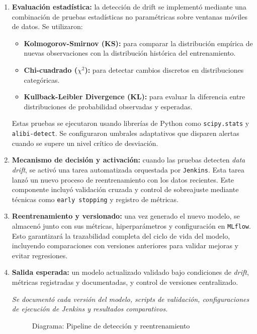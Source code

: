 \begin{enumerate}
    \item \textbf{Evaluación estadística:} la detección de drift se implementó mediante una combinación de pruebas estadísticas no paramétricas sobre ventanas móviles de datos. Se utilizaron:
    \begin{itemize}
      \item \textbf{Kolmogorov-Smirnov (KS):} para comparar la distribución empírica de nuevas observaciones con la distribución histórica del entrenamiento.
      \item \textbf{Chi-cuadrado (\(\chi^2\)):} para detectar cambios discretos en distribuciones categóricas.
      \item \textbf{Kullback-Leibler Divergence (KL):} para evaluar la diferencia entre distribuciones de probabilidad observadas y esperadas.
    \end{itemize}
    Estas pruebas se ejecutaron usando librerías de Python como \texttt{scipy.stats} y \texttt{alibi-detect}. Se configuraron umbrales adaptativos que disparen alertas cuando se supere un nivel crítico de desviación.
    
    \item \textbf{Mecanismo de decisión y activación:} cuando las pruebas detecten \textit{data drift}, se activó una tarea automatizada orquestada por \texttt{Jenkins}. Esta tarea lanzó un nuevo proceso de reentrenamiento con los datos recientes. Este componente incluyó validación cruzada y control de sobreajuste mediante técnicas como \texttt{early stopping} y registro de métricas.
    
    \item \textbf{Reentrenamiento y versionado:} una vez generado el nuevo modelo, se almacenó junto con sus métricas, hiperparámetros y configuración en \texttt{MLflow}. Esto garantizará la trazabilidad completa del ciclo de vida del modelo, incluyendo comparaciones con versiones anteriores para validar mejoras y evitar regresiones.
    
    \item \textbf{Salida esperada:} un modelo actualizado validado bajo condiciones de \textit{drift}, métricas registradas y documentadas, y control de versiones centralizado.

    \textit{Se documentó cada versión del modelo, scripts de validación, configuraciones de ejecución de Jenkins y resultados comparativos.}

    \begin{figure}[H]
    \centering
    \caption{Diagrama: Pipeline de detección y reentrenamiento}
    \end{figure}


\end{enumerate}
